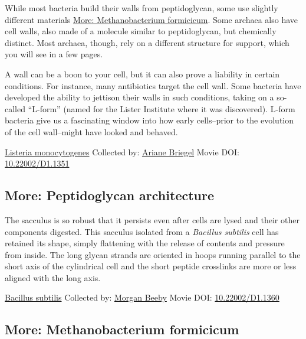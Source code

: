 \documentclass[]{tufte-book}
\begin{document}
While most bacteria build their walls from peptidoglycan, some use slightly different materials \protect\hyperlink{Methanobacterium_formicicum}{More: Methanobacterium formicicum}. Some archaea also have cell walls, also made of a molecule similar to peptidoglycan, but chemically distinct. Most archaea, though, rely on a different structure for support, which you will see in a few pages.

A wall can be a boon to your cell, but it can also prove a liability in certain conditions. For instance, many antibiotics target the cell wall. Some bacteria have developed the ability to jettison their walls in such conditions, taking on a so-called ``L-form'' (named for the Lister Institute where it was discovered). L-form bacteria give us a fascinating window into how early cells--prior to the evolution of the cell wall--might have looked and behaved.



\hypertarget{htmlwidget-5baa45c3e2f915e20081}{}

\label{fig:2-2}\protect\hyperlink{tree}{Listeria monocytogenes} Collected by: \protect\hyperlink{ariane_briegel}{Ariane Briegel} Movie DOI: \href{https://doi.org/10.22002/D1.1351}{10.22002/D1.1351}

\hypertarget{Peptidoglycan_architecture}{%
\subsection*{More: Peptidoglycan architecture}\label{Peptidoglycan_architecture}}

The sacculus is so robust that it persists even after cells are lysed and their other components digested. This sacculus isolated from a \emph{Bacillus subtilis} cell has retained its shape, simply flattening with the release of contents and pressure from inside. The long glycan strands are oriented in hoops running parallel to the short axis of the cylindrical cell and the short peptide crosslinks are more or less aligned with the long axis.



\hypertarget{htmlwidget-ef12d58d17ae9ba4a6a8}{}

\label{fig:2-2a}\protect\hyperlink{tree}{Bacillus subtilis} Collected by: \protect\hyperlink{morgan_beeby}{Morgan Beeby} Movie DOI: \href{https://doi.org/10.22002/D1.1360}{10.22002/D1.1360}

\hypertarget{Methanobacterium_formicicum}{%
\subsection*{More: Methanobacterium formicicum}\label{Methanobacterium_formicicum}}
\end{document}
